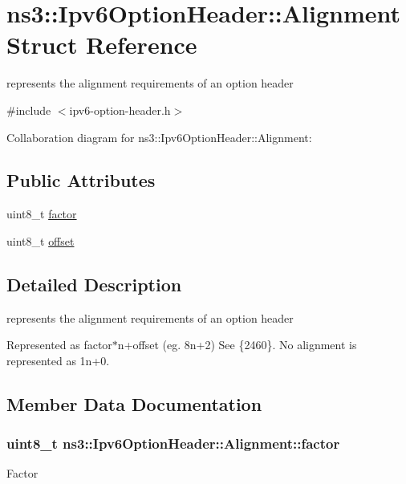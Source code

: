 \hypertarget{structns3_1_1Ipv6OptionHeader_1_1Alignment}{}\section{ns3\+:\+:Ipv6\+Option\+Header\+:\+:Alignment Struct Reference}
\label{structns3_1_1Ipv6OptionHeader_1_1Alignment}


represents the alignment requirements of an option header  




{\ttfamily \#include $<$ipv6-\/option-\/header.\+h$>$}



Collaboration diagram for ns3\+:\+:Ipv6\+Option\+Header\+:\+:Alignment\+:
\subsection*{Public Attributes}
\begin{DoxyCompactItemize}
\item 
uint8\+\_\+t \hyperlink{structns3_1_1Ipv6OptionHeader_1_1Alignment_a853c43187faf4c45143a134aa42c30da}{factor}
\item 
uint8\+\_\+t \hyperlink{structns3_1_1Ipv6OptionHeader_1_1Alignment_aa014078f0a72ae0984012aae7552133b}{offset}
\end{DoxyCompactItemize}


\subsection{Detailed Description}
represents the alignment requirements of an option header 

Represented as factor$\ast$n+offset (eg. 8n+2) See \{2460\}. No alignment is represented as 1n+0. 

\subsection{Member Data Documentation}
\subsubsection[{\texorpdfstring{factor}{factor}}]{\setlength{\rightskip}{0pt plus 5cm}uint8\+\_\+t ns3\+::\+Ipv6\+Option\+Header\+::\+Alignment\+::factor}\hypertarget{structns3_1_1Ipv6OptionHeader_1_1Alignment_a853c43187faf4c45143a134aa42c30da}{}\label{structns3_1_1Ipv6OptionHeader_1_1Alignment_a853c43187faf4c45143a134aa42c30da}
Factor 

